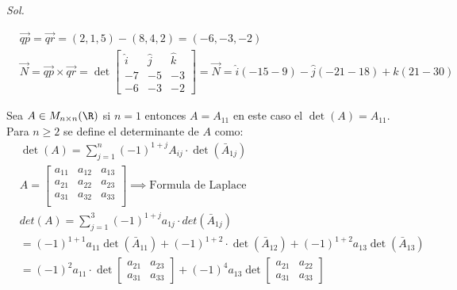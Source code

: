 \textit{ Sol. }

\begin{align*}
	 & \overrightarrow{qp}=\overrightarrow{qr}=(2,1,5)-(8,4,2)=(-6,-3,-2)                                                                                   \\
	 & \overrightarrow{N}=\overrightarrow{qp}\times \overrightarrow{qr}=\det \begin{bmatrix}
		                                                                         \hat{i} & \hat{j} & \hat{k} \\
		                                                                         -7      & -5      & -3      \\
		                                                                         -6      & -3      & -2
	                                                                         \end{bmatrix}=\overrightarrow{N}=\hat{i}(-15-9)-\hat{j}(-21-18)+\hat{k}(21-30)
\end{align*}

\begin{definition}
	Sea $A\in M_{n\times n}(\R)$ si $n=1$ entonces $A=A_{11}$
	en este caso el $\det(A)=A_{11}$. Para $n\geq 2$ se define el determinante de $A$ como:
	\begin{align}
		 & \det(A)=\sum_{j=1}^n(-1)^{1+j}A_{ij}\cdot \det\left(\bar{A}_{1j}\right)                                                                                      \\
		 & A=\begin{bmatrix} a_{11}&a_{12}&a_{13}\\ a_{21}&a_{22}&a_{23}\\ a_{31}&a_{32}&a_{33}\\ \end{bmatrix}\implies \text{Formula de Laplace}                       \\
		 & det(A)=\sum_{j=1}^3(-1)^{1+j}a_{1j}\cdot det(\bar{A}_{1j})                                                                                                   \\
		 & =(-1)^{1+1}a_{11}\det(\bar{A}_{11})+(-1)^{1+2}\cdot \det(\bar{A}_{12})+(-1)^{1+2}a_{13} \det(\bar{A}_{13})                                                   \\
		 & =(-1)^2a_{11}\cdot\det\begin{bmatrix} a_{21}&a_{23}\\ a_{31}&a_{33}\end{bmatrix}+(-1)^4a_{13}\det\begin{bmatrix} a_{21}&a_{22}\\ a_{31}&a_{33} \end{bmatrix}
	\end{align}
\end{definition}


